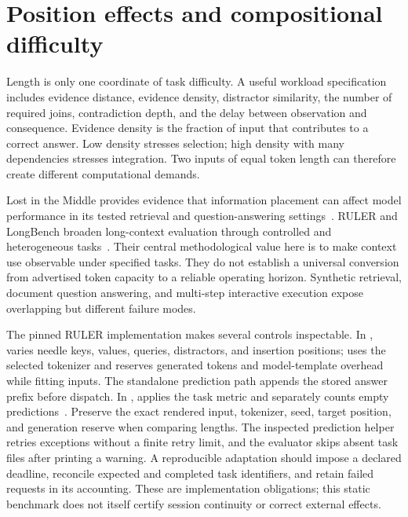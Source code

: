 \section{Position effects and compositional difficulty}\label{sec:C11:geometry}
Length is only one coordinate of task difficulty. A useful workload specification includes evidence distance, evidence density, distractor similarity, the number of required joins, contradiction depth, and the delay between observation and consequence. Evidence density is the fraction of input that contributes to a correct answer. Low density stresses selection; high density with many dependencies stresses integration. Two inputs of equal token length can therefore create different computational demands.

Lost in the Middle provides evidence that information placement can affect model performance in its tested retrieval and question-answering settings~\cite{liu2023lostmiddle}. RULER and LongBench broaden long-context evaluation through controlled and heterogeneous tasks~\cite{hsieh2024ruler,bai2023longbench}. Their central methodological value here is to make context use observable under specified tasks. They do not establish a universal conversion from advertised token capacity to a reliable operating horizon. Synthetic retrieval, document question answering, and multi-step interactive execution expose overlapping but different failure modes.

The pinned RULER implementation makes several controls inspectable. In ,  varies needle keys, values, queries, distractors, and insertion positions;  uses the selected tokenizer and reserves generated tokens and model-template overhead while fitting inputs. The standalone  prediction path appends the stored answer prefix before dispatch. In ,  applies the task metric and separately counts empty predictions~\cite{cumulative_a_ruler_repo_20261029}. Preserve the exact rendered input, tokenizer, seed, target position, and generation reserve when comparing lengths. The inspected prediction helper retries exceptions without a finite retry limit, and the evaluator skips absent task files after printing a warning. A reproducible adaptation should impose a declared deadline, reconcile expected and completed task identifiers, and retain failed requests in its accounting. These are implementation obligations; this static benchmark does not itself certify session continuity or correct external effects.

